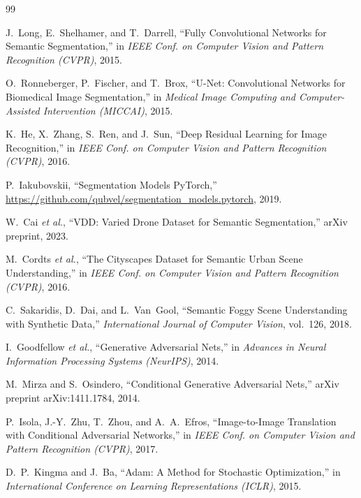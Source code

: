 \documentclass[11pt,a4paper]{article}
\begin{document}
\newpage
\begin{thebibliography}{99}
\setlength{\itemsep}{2pt}

J.~Long, E.~Shelhamer, and T.~Darrell,
``Fully Convolutional Networks for Semantic Segmentation,''
in \emph{IEEE Conf. on Computer Vision and Pattern Recognition (CVPR)}, 2015.

O.~Ronneberger, P.~Fischer, and T.~Brox,
``U-Net: Convolutional Networks for Biomedical Image Segmentation,''
in \emph{Medical Image Computing and Computer-Assisted Intervention
(MICCAI)}, 2015.

K.~He, X.~Zhang, S.~Ren, and J.~Sun,
``Deep Residual Learning for Image Recognition,''
in \emph{IEEE Conf. on Computer Vision and Pattern Recognition (CVPR)}, 2016.

P.~Iakubovskii,
``Segmentation Models PyTorch,''
\url{https://github.com/qubvel/segmentation_models.pytorch}, 2019.

W.~Cai \emph{et al.},
``VDD: Varied Drone Dataset for Semantic Segmentation,''
arXiv preprint, 2023.

M.~Cordts \emph{et al.},
``The Cityscapes Dataset for Semantic Urban Scene Understanding,''
in \emph{IEEE Conf. on Computer Vision and Pattern Recognition (CVPR)}, 2016.

C.~Sakaridis, D.~Dai, and L.~Van~Gool,
``Semantic Foggy Scene Understanding with Synthetic Data,''
\emph{International Journal of Computer Vision}, vol.~126, 2018.

I.~Goodfellow \emph{et al.},
``Generative Adversarial Nets,''
in \emph{Advances in Neural Information Processing Systems (NeurIPS)}, 2014.

M.~Mirza and S.~Osindero,
``Conditional Generative Adversarial Nets,''
arXiv preprint arXiv:1411.1784, 2014.

P.~Isola, J.-Y.~Zhu, T.~Zhou, and A.~A.~Efros,
``Image-to-Image Translation with Conditional Adversarial Networks,''
in \emph{IEEE Conf. on Computer Vision and Pattern Recognition (CVPR)}, 2017.

D.~P.~Kingma and J.~Ba,
``Adam: A Method for Stochastic Optimization,''
in \emph{International Conference on Learning Representations (ICLR)}, 2015.


\end{thebibliography}
\end{document}
